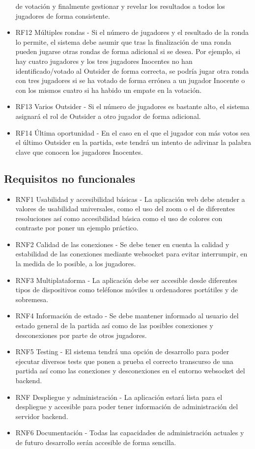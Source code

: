 \begin{itemize}
	      de votación y finalmente gestionar y revelar los resultados a todos los jugadores de forma consistente.
	\item RF12 Múltiples rondas - Si el número de jugadores  y el resultado de la ronda lo permite, el sistema debe asumir que tras
	      la finalización de una ronda pueden jugarse otras rondas de forma adicional si se desea. Por ejemplo, si hay cuatro jugadores y los tres jugadores
	      Inocentes no han identificado/votado al Outsider de forma correcta, se podría jugar otra ronda con tres jugadores si se ha votado de forma
	      errónea a un jugador Inocente o con los mismos cuatro si ha habido un empate en la votación.
	\item RF13 Varios Outsider - Si el número de jugadores es bastante alto, el sistema asignará el rol de Outsider a otro jugador de forma adicional.
	\item RF14 Última oportunidad - En el caso en el que el jugador con más votos sea el último Outsider en la partida, este tendrá un intento de
	      adivinar la palabra clave que conocen los jugadores Inocentes.
\end{itemize}

\subsection{Requisitos no funcionales}

\begin{itemize}
	\item RNF1 Usabilidad y accesibilidad básicas - La aplicación web debe atender a valores de usabilidad universales, como el uso del zoom o
	      el de diferentes resoluciones así como accesibilidad básica como el uso de colores con contraste por poner un ejemplo práctico.
	\item RNF2 Calidad de las conexiones - Se debe tener en cuenta la calidad y estabilidad de las conexiones mediante websocket para evitar
	      interrumpir, en la medida de lo posible, a los jugadores.
	\item RNF3 Multiplataforma - La aplicación debe ser accesible desde diferentes tipos de dispositivos como teléfonos móviles u ordenadores portátiles
	      y de sobremesa.
	\item RNF4 Información de estado - Se debe mantener informado al usuario del estado general de la partida así como de las posibles conexiones y desconexiones
	      por parte de otros jugadores.
	\item RNF5 Testing - El sistema tendrá una opción de desarrollo para poder ejecutar diversos tests que ponen
	      a prueba el correcto transcurso de una partida así como las conexiones y desconexiones en el entorno websocket del backend.
	\item RNF Despliegue y administración - La aplicación estará lista para el despliegue y accesible para poder tener información de administración del servidor
	      backend.
	\item RNF6 Documentación - Todas las capacidades de administración actuales y de futuro desarrollo serán accesible de forma sencilla.
\end{itemize}

